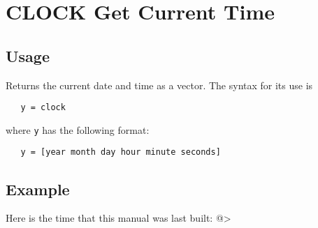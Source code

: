 \section{CLOCK Get Current Time}

\subsection{Usage}

Returns the current date and time as a vector.  The syntax for its use is
\begin{verbatim}
   y = clock
\end{verbatim}
where \verb|y| has the following format:
\begin{verbatim}
   y = [year month day hour minute seconds]
\end{verbatim}
\subsection{Example}

Here is the time that this manual was last built:
@>
